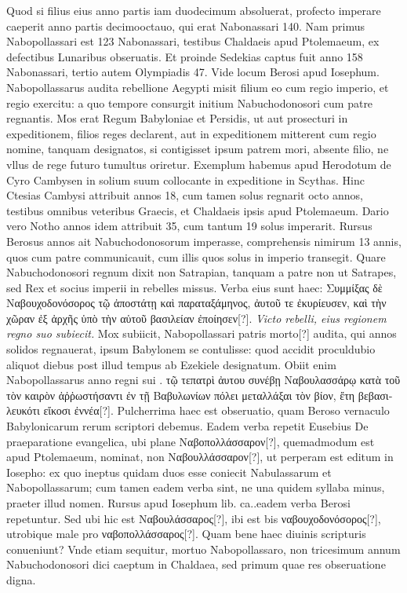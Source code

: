 Quod si filius eius anno  partis iam duodecimum
absoluerat, profecto imperare caeperit anno partis decimooctauo,
qui erat Nabonassari 140.
Nam primus Nabopollassari est 123 Nabonassari,
testibus Chaldaeis apud Ptolemaeum, ex defectibus Lunaribus
obseruatis.
Et proinde Sedekias captus fuit anno 158 Nabonassari,
tertio autem Olympiadis 47.
Vide locum Berosi apud Iosephum.
Nabopollassarus audita rebellione Aegypti misit filium eo
cum regio imperio, et regio exercitu: a quo tempore consurgit initium
Nabuchodonosori cum patre regnantis.
Mos erat Regum Babyloniae
et Persidis, ut aut prosecturi in expeditionem, filios reges declarent,
aut in expeditionem mitterent cum regio nomine, tanquam
designatos, si contigisset ipsum patrem mori, absente filio, ne
vllus de rege futuro tumultus oriretur.
Exemplum habemus apud
Herodotum de Cyro Cambysen in solium suum collocante in expeditione
in Scythas.
Hinc Ctesias Cambysi attribuit annos 18,
cum tamen solus regnarit octo annos, testibus omnibus veteribus
Graecis, et Chaldaeis ipsis apud Ptolemaeum.
Dario vero Notho annos
idem attribuit 35, cum tantum 19 solus imperarit.
Rursus Berosus
 annos ait Nabuchodonosorum imperasse, comprehensis
nimirum 13 annis, quos cum patre communicauit, cum
illis quos solus in imperio transegit.
Quare Nabuchodonosori regnum
dixit non Satrapian, tanquam a patre non ut Satrapes, sed Rex
et socius imperii in rebelles missus.
Verba eius sunt haec: \textgreek{Συμμίξας
δὲ Ναβουχοδονόσορος τῷ ἀποστάτῃ καὶ παραταξάμηνος, ἀυτοῦ τε ἐκυρίευσεν, καὶ
τὴν χῶραν ἐξ ἀρχῆς ὑπὸ τὴν αὑτοῦ βασιλείαν ἐποίησεν[?]}.
\textit{Victo rebelli, eius regionem regno suo subiecit.}
Mox subiicit, Nabopollassari patris morto[?]
audita, qui  annos solidos regnauerat, ipsum Babylonem se
contulisse: quod accidit proculdubio aliquot diebus post illud tempus
ab Ezekiele designatum.
Obiit enim Nabopollassarus anno regni
sui .
\textgreek{τῷ τεπατρὶ ἀυτου συνέβῃ Ναβουλασσάρῳ κατὰ
 τοῦ τὸν καιρὸν
ἀῤῥωστήσαντι ἐν τῇ Βαβυλωνίων πόλει μεταλλάξαι τὸν βίον, ἔτη βεβασιλευκότι
εἴκοσι ἐννέα[?]}.
Pulcherrima haec est obseruatio, quam Beroso vernaculo
Babylonicarum rerum scriptori debemus.
Eadem verba repetit Eusebius
De praeparatione %
 evangelica, ubi plane \textgreek{Ναβοπολλάσσαρον[?]}, quemadmodum
est apud Ptolemaeum, %
 nominat, non \textgreek{Ναβουλλάσσαρον[?]}, ut perperam
est editum in Iosepho: ex quo ineptus quidam duos esse coniecit
Nabulassarum et Nabopollassarum; cum tamen eadem verba sint, ne
una quidem syllaba minus, praeter illud nomen.
Rursus apud Iosephum
lib. ca..eadem verba Berosi repetuntur.
Sed ubi hic est \textgreek{Ναβουλάσσαρος[?]},
ibi est bis \textgreek{ναβουχοδονόσορος[?]},
 utrobique male pro \textgreek{ναβοπολλάσσαρος[?]}.
Quam bene haec diuinis scripturis conueniunt?
Vnde etiam sequitur, mortuo Nabopollassaro, non tricesimum
 annum Nabuchodonosori
dici caeptum in Chaldaea, sed primum quae res obseruatione
digna.

